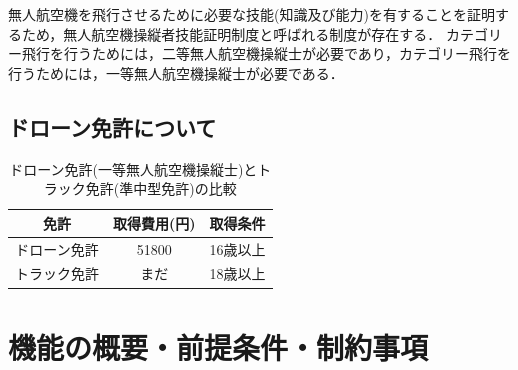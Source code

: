 \documentclass[a4paper, titlepage]{jsarticle}
\begin{document}
無人航空機を飛行させるために必要な技能(知識及び能力)を有することを証明するため，無人航空機操縦者技能証明制度と呼ばれる制度が存在する．
カテゴリー飛行を行うためには，二等無人航空機操縦士が必要であり，カテゴリー飛行を行うためには，一等無人航空機操縦士が必要である\cite{delivery_guidelines_2023}．

\subsection{ドローン免許について}
\begin{table}[H]
  \centering
  \caption{ドローン免許(一等無人航空機操縦士)とトラック免許(準中型免許)の比較}
  \begin{tabular}{c c c} \hline
    免許     & 取得費用(円) & 取得条件  \\ \hline \hline
    ドローン免許 & 51800   & 16歳以上 \\
    トラック免許 & まだ      & 18歳以上 \\ \hline
  \end{tabular}
  \label{tab:hikaku}
\end{table}



\section{機能の概要・前提条件・制約事項}
\end{document}
